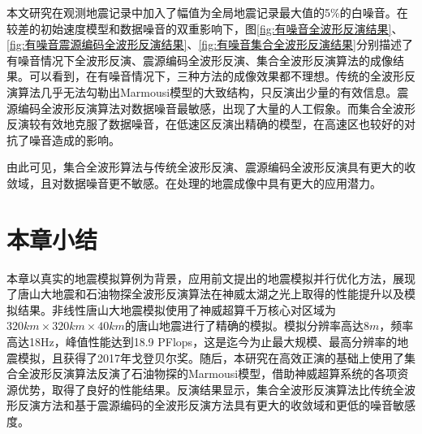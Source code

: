 本文研究在观测地震记录中加入了幅值为全局地震记录最大值的5\%的白噪音。在较差的初始速度模型和数据噪音的双重影响下，图\ref{fig:有噪音全波形反演结果}、\ref{fig:有噪音震源编码全波形反演结果}、\ref{fig:有噪音集合全波形反演结果}分别描述了有噪音情况下全波形反演、震源编码全波形反演、集合全波形反演算法的成像结果。可以看到，在有噪音情况下，三种方法的成像效果都不理想。传统的全波形反演算法几乎无法勾勒出Marmousi模型的大致结构，只反演出少量的有效信息。震源编码全波形反演算法对数据噪音最敏感，出现了大量的人工假象。而集合全波形反演较有效地克服了数据噪音，在低速区反演出精确的模型，在高速区也较好的对抗了噪音造成的影响。

由此可见，集合全波形算法与传统全波形反演、震源编码全波形反演具有更大的收敛域，且对数据噪音更不敏感。在处理的地震成像中具有更大的应用潜力。

\section{本章小结}

本章以真实的地震模拟算例为背景，应用前文提出的地震模拟并行优化方法，展现了唐山大地震和石油物探全波形反演算法在神威太湖之光上取得的性能提升以及模拟结果。非线性唐山大地震模拟使用了神威超算千万核心对区域为$320km\times 320km \times 40km$的唐山地震进行了精确的模拟。模拟分辨率高达$8m$，频率高达18Hz，峰值性能达到18.9 PFlops，这是迄今为止最大规模、最高分辨率的地震模拟，且获得了2017年戈登贝尔奖。随后，本研究在高效正演的基础上使用了集合全波形反演算法反演了石油物探的Marmousi模型，借助神威超算系统的各项资源优势，取得了良好的性能结果。反演结果显示，集合全波形反演算法比传统全波形反演方法和基于震源编码的全波形反演方法具有更大的收敛域和更低的噪音敏感度。
